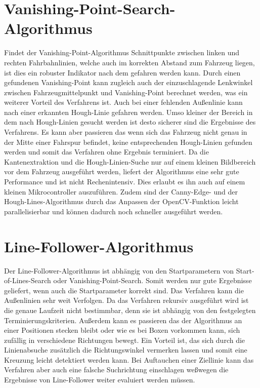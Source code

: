 \section{Vanishing-Point-Search-Algorithmus}
\label{section:Vanishing-Point-Search-Algorithmus} 

Findet der Vanishing-Point-Algorithmus Schnittpunkte zwischen linken und rechten Fahrbahnlinien, welche auch im korrekten Abstand zum Fahrzeug liegen, ist dies ein robuster Indikator nach dem gefahren werden kann.
Durch einen gefundenen Vanishing-Point kann zugleich auch der einzuschlagende Lenkwinkel zwischen Fahrzeugmittelpunkt und Vanishing-Point berechnet werden, was ein weiterer Vorteil des Verfahrens ist.
Auch bei einer fehlenden Au{\ss}enlinie kann nach einer erkannten Hough-Linie gefahren werden.
Umso kleiner der Bereich in dem nach Hough-Linien gesucht werden ist desto sicherer sind die Ergebnisse des Verfahrens. Es kann aber passieren das wenn sich das Fahrzeug nicht genau in der Mitte einer Fahrspur befindet, keine entsprechenden Hough-Linien gefunden werden und somit das Verfahren ohne Ergebnis terminiert. Da die Kantenextraktion und die Hough-Linien-Suche nur auf einem kleinen Bildbereich vor dem Fahrzeug ausgef{\"u}hrt werden, liefert der Algorithmus eine sehr gute Performance und ist nicht Rechenintensiv. Dies erlaubt es ihn auch auf einem kleinen Mikrocontroller auszuf{\"u}hren. Zudem sind der Canny-Edge- und der Hough-Lines-Algorithmus durch das Anpassen der OpenCV-Funktion leicht parallelisierbar und k{\"o}nnen dadurch noch schneller ausgef{\"u}hrt werden.  





\section{Line-Follower-Algorithmus}
\label{section:Line-Follower-Algorithmus}
Der Line-Follower-Algorithmus ist abh\"angig von den Startparametern von Start-of-Lines-Search oder Vanishing-Point-Search. Somit werden nur gute Ergebnisse geliefert, wenn auch die Startparameter korrekt sind.
Das Verfahren kann die Au{\ss}enlinien sehr weit Verfolgen. Da das Verfahren rekursiv ausgef\"uhrt wird ist die genaue Laufzeit nicht bestimmbar, denn sie ist abh\"angig von den festgelegten Terminierungskriterien. Au{\ss}erdem kann es passieren das der Algorithmus an einer Positionen stecken bleibt oder wie es bei Boxen vorkommen kann, sich zuf\"allig in verschiedene Richtungen bewegt.
Ein Vorteil ist, das sich durch die Linienabsuche zus\"atzlich die Richtungswinkel vermerken lassen und somit eine Kreuzung leicht detektiert werden kann. Bei Auftauchen einer Ziellinie kann das Verfahren aber auch eine falsche Suchrichtung einschlagen we{\ss}wegen die Ergebnisse von Line-Follower weiter evaluiert werden m\"ussen.
 

